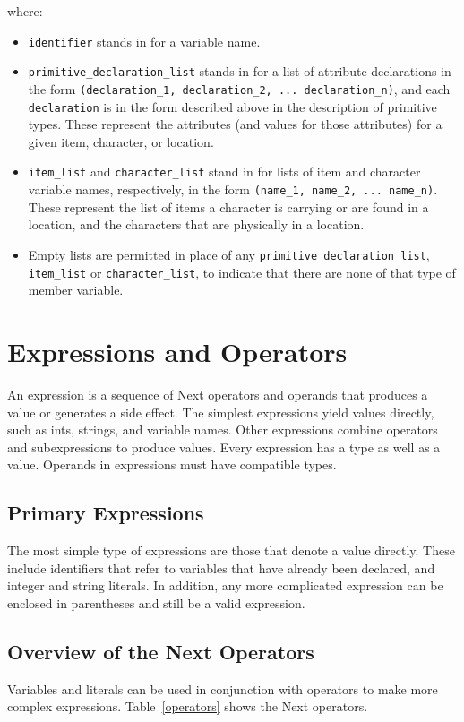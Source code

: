 \documentclass[12pt]{article}
\begin{document}
\noindent where:
\begin{itemize}
\item \texttt{identifier} stands in for a variable name.
\item \texttt{primitive\_declaration\_list} stands in for a list of attribute declarations in the form \texttt{(declaration\_1, declaration\_2, ... declaration\_n)}, and each \texttt{declaration} is in the form described above in the description of primitive types.  These represent the attributes (and values for those attributes) for a given item, character, or location.
\item \texttt{item\_list} and \texttt{character\_list} stand in for lists of item and character variable names, respectively, in the form \texttt{(name\_1, name\_2, ... name\_n)}.  These represent the list of items a character is carrying or are found in a location, and the characters that are physically in a location.
\item Empty lists are permitted in place of any \texttt{primitive\_declaration\_list}, \texttt{item\_list} or \texttt{character\_list}, to indicate that there are none of that type of member variable.
\end{itemize}

\section{Expressions and Operators}
An expression is a sequence of Next operators and operands that produces a value or generates a side effect.  The simplest expressions yield values directly, such as ints, strings, and variable names.  Other expressions combine operators and subexpressions to produce values.  Every expression has a type as well as a value.  Operands in expressions must have compatible types.

\subsection{Primary Expressions}
The most simple type of expressions are those that denote a value directly.  These include identifiers that refer to variables that have already been declared, and integer and string literals.  In addition, any more complicated expression can be enclosed in parentheses and still be a valid expression.

\subsection{Overview of the Next Operators}
Variables and literals can be used in conjunction with operators to make more complex expressions.  Table~\ref{operators} shows the Next operators.
\end{document}
